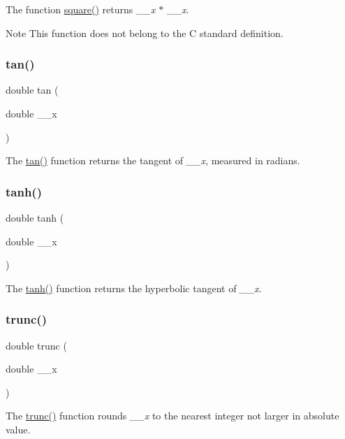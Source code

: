 The function \hyperlink{group__avr__math_gabb95d8256ff81d58f092c065ea204293}{square()} returns {\itshape \+\_\+\+\_\+x $\ast$ \+\_\+\+\_\+x}.

\begin{DoxyNote}{Note}
This function does not belong to the C standard definition. 
\end{DoxyNote}
\mbox{\label{group__avr__math_ga3aa121cf8eee9dc1647c0b83ebbd72e9}} 
\subsubsection{\texorpdfstring{tan()}{tan()}}
{\footnotesize\ttfamily double tan (\begin{DoxyParamCaption}\item[{double}]{\+\_\+\+\_\+x }\end{DoxyParamCaption})}

The \hyperlink{group__avr__math_ga3aa121cf8eee9dc1647c0b83ebbd72e9}{tan()} function returns the tangent of {\itshape \+\_\+\+\_\+x}, measured in radians. \mbox{\label{group__avr__math_ga97f0f3ecd653766bd1a94910cb0cad9f}} 
\subsubsection{\texorpdfstring{tanh()}{tanh()}}
{\footnotesize\ttfamily double tanh (\begin{DoxyParamCaption}\item[{double}]{\+\_\+\+\_\+x }\end{DoxyParamCaption})}

The \hyperlink{group__avr__math_ga97f0f3ecd653766bd1a94910cb0cad9f}{tanh()} function returns the hyperbolic tangent of {\itshape \+\_\+\+\_\+x}. \mbox{\label{group__avr__math_ga63f7d01fc9b6a91bca4f71089213ea42}} 
\subsubsection{\texorpdfstring{trunc()}{trunc()}}
{\footnotesize\ttfamily double trunc (\begin{DoxyParamCaption}\item[{double}]{\+\_\+\+\_\+x }\end{DoxyParamCaption})}

The \hyperlink{group__avr__math_ga63f7d01fc9b6a91bca4f71089213ea42}{trunc()} function rounds {\itshape \+\_\+\+\_\+x} to the nearest integer not larger in absolute value. 